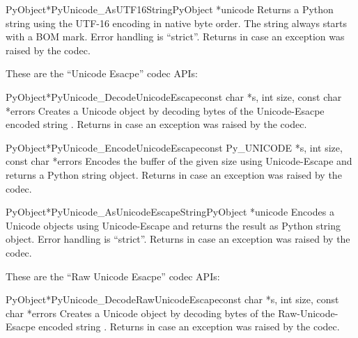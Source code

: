 \documentclass{manual}
\begin{document}
\begin{cfuncdesc}{PyObject*}{PyUnicode_AsUTF16String}{PyObject *unicode}
Returns a Python string using the UTF-16 encoding in native byte
order. The string always starts with a BOM mark. Error handling is
``strict''. Returns \NULL{} in case an exception was raised by the
codec.
\end{cfuncdesc}


These are the ``Unicode Esacpe'' codec APIs:

\begin{cfuncdesc}{PyObject*}{PyUnicode_DecodeUnicodeEscape}{const char *s,
                                               int size,
                                               const char *errors}
Creates a Unicode object by decoding  bytes of the Unicode-Esacpe
encoded string . Returns \NULL{} in case an exception was
raised by the codec.
\end{cfuncdesc}

\begin{cfuncdesc}{PyObject*}{PyUnicode_EncodeUnicodeEscape}{const Py_UNICODE *s,
                                               int size,
                                               const char *errors}
Encodes the  buffer of the given size using Unicode-Escape
and returns a Python string object.  Returns \NULL{} in case an
exception was raised by the codec.
\end{cfuncdesc}

\begin{cfuncdesc}{PyObject*}{PyUnicode_AsUnicodeEscapeString}{PyObject *unicode}
Encodes a Unicode objects using Unicode-Escape and returns the result
as Python string object. Error handling is ``strict''. Returns
\NULL{} in case an exception was raised by the codec.
\end{cfuncdesc}


These are the ``Raw Unicode Esacpe'' codec APIs:

\begin{cfuncdesc}{PyObject*}{PyUnicode_DecodeRawUnicodeEscape}{const char *s,
                                               int size,
                                               const char *errors}
Creates a Unicode object by decoding  bytes of the Raw-Unicode-Esacpe
encoded string . Returns \NULL{} in case an exception was
raised by the codec.
\end{cfuncdesc}
\end{document}
